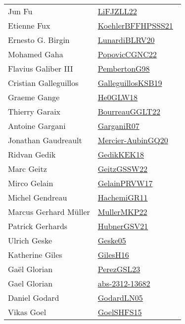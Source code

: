 {\begin{longtable}{p{4cm}p{20cm}}
Jun Fu & \href{works/LiFJZLL22.pdf}{LiFJZLL22}~\cite{LiFJZLL22}\\
Etienne Fux & \href{works/KoehlerBFFHPSSS21.pdf}{KoehlerBFFHPSSS21}~\cite{KoehlerBFFHPSSS21}\\
Ernesto G. Birgin & \href{works/LunardiBLRV20.pdf}{LunardiBLRV20}~\cite{LunardiBLRV20}\\
Mohamed Gaha & \href{works/PopovicCGNC22.pdf}{PopovicCGNC22}~\cite{PopovicCGNC22}\\
Flavius Galiber III & \href{works/PembertonG98.pdf}{PembertonG98}~\cite{PembertonG98}\\
Cristian Galleguillos & \href{works/GalleguillosKSB19.pdf}{GalleguillosKSB19}~\cite{GalleguillosKSB19}\\
Graeme Gange & \href{works/He0GLW18.pdf}{He0GLW18}~\cite{He0GLW18}\\
Thierry Garaix & \href{works/BourreauGGLT22.pdf}{BourreauGGLT22}~\cite{BourreauGGLT22}\\
Antoine Gargani & \href{works/GarganiR07.pdf}{GarganiR07}~\cite{GarganiR07}\\
Jonathan Gaudreault & \href{works/Mercier-AubinGQ20.pdf}{Mercier-AubinGQ20}~\cite{Mercier-AubinGQ20}\\
Ridvan Gedik & \href{works/GedikKEK18.pdf}{GedikKEK18}~\cite{GedikKEK18}\\
Marc Geitz & \href{works/GeitzGSSW22.pdf}{GeitzGSSW22}~\cite{GeitzGSSW22}\\
Mirco Gelain & \href{works/GelainPRVW17.pdf}{GelainPRVW17}~\cite{GelainPRVW17}\\
Michel Gendreau & \href{works/HachemiGR11.pdf}{HachemiGR11}~\cite{HachemiGR11}\\
Marcus Gerhard M{\"{u}}ller & \href{works/MullerMKP22.pdf}{MullerMKP22}~\cite{MullerMKP22}\\
Patrick Gerhards & \href{works/HubnerGSV21.pdf}{HubnerGSV21}~\cite{HubnerGSV21}\\
Ulrich Geske & \href{works/Geske05.pdf}{Geske05}~\cite{Geske05}\\
Katherine Giles & \href{works/GilesH16.pdf}{GilesH16}~\cite{GilesH16}\\
Ga{\"{e}}l Glorian & \href{works/PerezGSL23.pdf}{PerezGSL23}~\cite{PerezGSL23}\\
Gael Glorian & \href{works/abs-2312-13682.pdf}{abs-2312-13682}~\cite{abs-2312-13682}\\
Daniel Godard & \href{}{GodardLN05}~\cite{GodardLN05}\\
Vikas Goel & \href{works/GoelSHFS15.pdf}{GoelSHFS15}~\cite{GoelSHFS15}\\

\end{longtable}}
